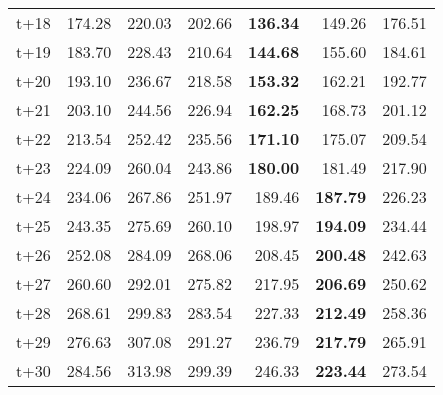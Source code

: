 \begin{table}[H]
\begin{tabular}{lrrrrrr}
t+18  & 174.28  & 220.03  & 202.66  & \textbf{136.34}  & 149.26  & 176.51  \\
t+19  & 183.70  & 228.43  & 210.64  & \textbf{144.68}  & 155.60  & 184.61  \\
t+20  & 193.10  & 236.67  & 218.58  & \textbf{153.32}  & 162.21  & 192.77  \\
t+21  & 203.10  & 244.56  & 226.94  & \textbf{162.25}  & 168.73  & 201.12  \\
t+22  & 213.54  & 252.42  & 235.56  & \textbf{171.10}  & 175.07  & 209.54  \\
t+23  & 224.09  & 260.04  & 243.86  & \textbf{180.00}  & 181.49  & 217.90  \\
t+24  & 234.06  & 267.86  & 251.97  & 189.46  & \textbf{187.79}  & 226.23  \\
t+25  & 243.35  & 275.69  & 260.10  & 198.97  & \textbf{194.09}  & 234.44  \\
t+26  & 252.08  & 284.09  & 268.06  & 208.45  & \textbf{200.48}  & 242.63  \\
t+27  & 260.60  & 292.01  & 275.82  & 217.95  & \textbf{206.69}  & 250.62  \\
t+28  & 268.61  & 299.83  & 283.54  & 227.33  & \textbf{212.49}  & 258.36  \\
t+29  & 276.63  & 307.08  & 291.27  & 236.79  & \textbf{217.79}  & 265.91  \\
t+30  & 284.56  & 313.98  & 299.39  & 246.33  & \textbf{223.44}  & 273.54  \\

\bottomrule
\end{tabular}
\end{table}
